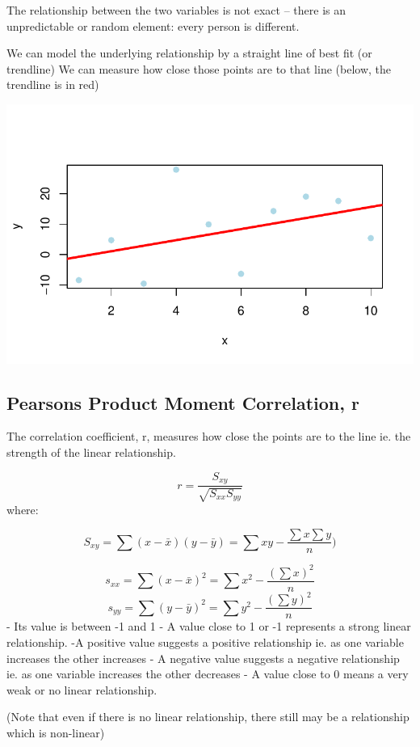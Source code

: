 \documentclass[
  letterpaper,
  DIV=11,
  numbers=noendperiod]{scrartcl}
\begin{document}
The relationship between the two variables is not exact -- there is an
unpredictable or random element: every person is different.

We can model the underlying relationship by a straight line of best fit
(or trendline) We can measure how close those points are to that line
(below, the trendline is in red)

\includegraphics{Week8a_files/figure-pdf/unnamed-chunk-2-1.pdf}

\subsection{Pearsons Product Moment Correlation,
r}\label{pearsons-product-moment-correlation-r}

The correlation coefficient, r, measures how close the points are to the
line ie. the strength of the linear relationship.

\[ r = \frac{S_{xy}}{\sqrt{S_{xx}S_{yy}}} \] where:

\[ S_{xy} = \sum(x - \bar{x})(y - \bar{y}) = \sum xy - \frac{\sum x \sum y}{n})  \]

\[ s_{xx} = \sum(x - \bar{x})^2 = \sum x^2 - \frac{(\sum x)^2}{n} \]
\[ s_{yy} = \sum(y - \bar{y})^2 = \sum y^2 - \frac{(\sum y)^2}{n} \] -
Its value is between -1 and 1 - A value close to 1 or -1 represents a
strong linear relationship. -A positive value suggests a positive
relationship ie. as one variable increases the other increases - A
negative value suggests a negative relationship ie. as one variable
increases the other decreases - A value close to 0 means a very weak or
no linear relationship.

(Note that even if there is no linear relationship, there still may be a
relationship which is non-linear)
\end{document}

